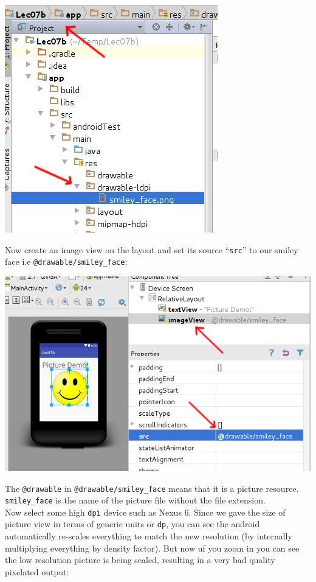 \begin{center}
	\includegraphics[scale=0.4]{chapters/ch06/images/8}
\end{center}

Now create an image view on the layout and set its source ``\texttt{src}'' to our smiley face i.e \texttt{@drawable/smiley\_face}:

\begin{center}
	\includegraphics[scale=0.4]{chapters/ch06/images/9}
\end{center}

The \texttt{@drawable} in \texttt{@drawable/smiley\_face} means that it is a picture resource. \texttt{smiley\_face} is the name of the picture file without the file extension. \\

Now select some high \texttt{dpi} device such as Nexus 6. Since we gave the size of picture view in terms of generic units or \texttt{dp}, you can see the android
automatically re-scales everything to match the new resolution (by internally multiplying
everything by density factor). But now uf you zoom in you can see the low resolution picture is being scaled, resulting in a very bad quality pixelated output:

